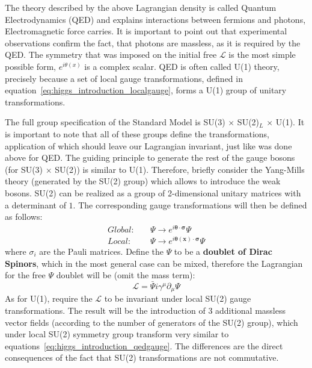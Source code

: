 The theory described by the above Lagrangian density is called Quantum Electrodynamics (QED) and explains interactions between fermions and photons, Electromagnetic force carries. It is important to point out that experimental observations confirm the fact, that photons are massless, as it is required by the QED. The symmetry that was imposed on the initial free $\mathcal{L}$ is the most simple possible form, $e^{i\theta(x)}$ is a complex scalar. QED is often called U(1) theory, precisely because a set of local gauge transformations, defined in equation~\ref{eq:higgs_introduction_localgauge}, forms a U(1) group of unitary transformations.

The full group specification of the Standard Model is SU(3) $\times$ SU(2)$_L$ $\times$ U(1). It is important to note that all of these groups define the transformations, application of which should leave our Lagrangian invariant, just like was done above for QED. The guiding principle to generate the rest of the gauge bosons (for SU(3) $\times$ SU(2)) is similar to U(1). Therefore, briefly consider the Yang-Mills theory (generated by the SU(2) group) which allows to introduce the weak bosons. SU(2) can be realized as a group of 2-dimensional unitary matrices with a determinant of $1$. The corresponding gauge transformations will then be defined as follows:
\begin{subequations}\label{eq:higgs_introduction_gaugesu2}
\begin{align}
    Global:&\quad \Psi \rightarrow e^{i\boldsymbol{\theta} \cdot \boldsymbol{\sigma}}\Psi\\
    Local:&\quad \Psi \rightarrow e^{i\boldsymbol{\theta(x)} \cdot \boldsymbol\sigma}\Psi\label{eq:higgs_introduction_localgaugesu2}
\end{align}
\end{subequations}
where $\sigma_{i}$ are the Pauli matrices. Define the $\Psi$ to be a \textbf{doublet of Dirac Spinors}, which in the most general case can be mixed, therefore the Lagrangian for the free $\Psi$ doublet will be (omit the mass term):
\begin{equation}
    \label{eq:higgs_introduction_lagrangiagnsu2free}
    \mathcal{L} = \bar{\Psi}i\gamma^{\mu}\partial_{\mu}\Psi
\end{equation}
As for U(1), require the $\mathcal{L}$ to be invariant under local SU(2) gauge transformations. The result will be the introduction of $3$ additional massless vector fields (according to the number of generators of the SU(2) group), which under local SU(2) symmetry group transform very similar to equations~\ref{eq:higgs_introduction_qedgauge}. The differences are the direct consequences of the fact that SU(2) transformations are not commutative.

